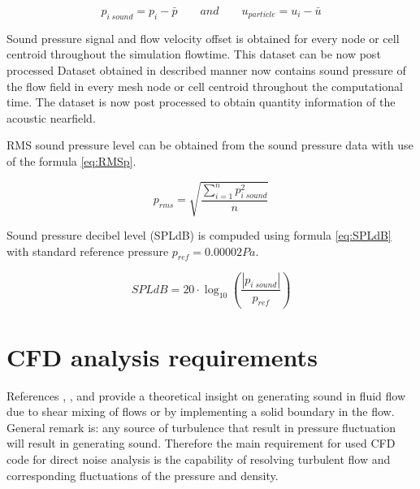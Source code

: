 \begin{equation} \label{eq:off}
p_{i \; sound} = p_i - \bar{p} \qquad and \qquad u_{particle} = u_i - \bar{u}
\end{equation}

Sound pressure signal and flow velocity offset is obtained for every node or cell centroid throughout the simulation flowtime. This dataset can be now post processed 
Dataset obtained in described manner now contains sound pressure of the flow field in every mesh node or cell centroid throughout the computational time. The dataset is now post processed to obtain quantity information of the acoustic nearfield. 

RMS sound pressure level can be obtained from the sound pressure data with use of the formula \ref{eq:RMSp}.

\begin{equation} \label{eq:RMSp}
p_{rms} = \sqrt{\frac{\sum_{i=1}^{n} p_{i \; sound}^{2}}{n}}
\end{equation}

Sound pressure decibel level (SPLdB) is compuded using formula \ref{eq:SPLdB} with standard reference pressure $p_{ref} = 0.00002 Pa$.

\begin{equation} \label{eq:SPLdB}
SPLdB = 20 \cdot \log_{10}\left(\frac{|p_{i \; sound}|}{p_{ref}}\right)
\end{equation}





\section{CFD analysis requirements} \label{cfdreq}
References \citep{Light1}, \citep{Light2}, \citep{FWH} and \citep{curle} provide a theoretical insight on generating sound in fluid flow due to shear mixing of flows or by implementing a solid boundary in the flow. General remark is: any source of turbulence that result in pressure fluctuation will result in generating sound. Therefore the main requirement for used CFD code for direct noise analysis is the capability of resolving turbulent flow and corresponding fluctuations of the pressure and density.

